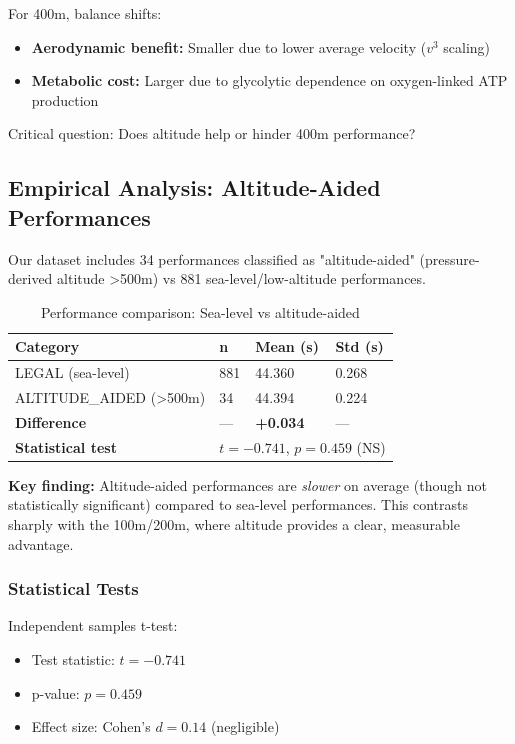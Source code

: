 For 400m, balance shifts:
\begin{itemize}
    \item \textbf{Aerodynamic benefit:} Smaller due to lower average velocity ($v^3$ scaling)
    \item \textbf{Metabolic cost:} Larger due to glycolytic dependence on oxygen-linked ATP production
\end{itemize}

Critical question: Does altitude help or hinder 400m performance?

\subsection{Empirical Analysis: Altitude-Aided Performances}

Our dataset includes 34 performances classified as "altitude-aided" (pressure-derived altitude >500m) vs 881 sea-level/low-altitude performances.

\begin{table}[H]
\centering
\caption{Performance comparison: Sea-level vs altitude-aided}
\begin{tabular}{@{}llll@{}}
\toprule
\textbf{Category} & \textbf{n} & \textbf{Mean (s)} & \textbf{Std (s)} \\
\midrule
LEGAL (sea-level) & 881 & 44.360 & 0.268 \\
ALTITUDE\_AIDED (>500m) & 34 & 44.394 & 0.224 \\
\midrule
\textbf{Difference} & — & \textbf{+0.034} & — \\
\textbf{Statistical test} & \multicolumn{3}{l}{$t = -0.741$, $p = 0.459$ (NS)} \\
\bottomrule
\end{tabular}
\end{table}

\textbf{Key finding:} Altitude-aided performances are \textit{slower} on average (though not statistically significant) compared to sea-level performances. This contrasts sharply with the 100m/200m, where altitude provides a clear, measurable advantage.

\subsubsection{Statistical Tests}

Independent samples t-test:
\begin{itemize}
    \item Test statistic: $t = -0.741$
    \item p-value: $p = 0.459$
    \item Effect size: Cohen's $d = 0.14$ (negligible)
\end{itemize}

